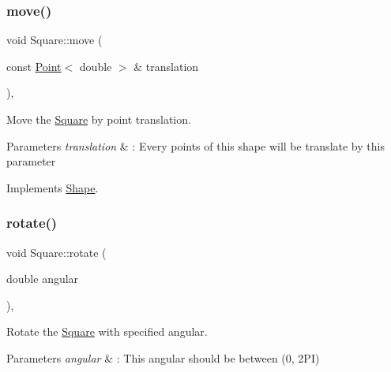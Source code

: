 \mbox{\label{classSquare_a75b2fd22fc3895b83bc20728afb20b10}} 
\subsubsection{\texorpdfstring{move()}{move()}}
{\footnotesize\ttfamily void Square\+::move (\begin{DoxyParamCaption}\item[{const \hyperlink{classPoint}{Point}$<$ double $>$ \&}]{translation }\end{DoxyParamCaption})\hspace{0.3cm}{\ttfamily [override]}, {\ttfamily [virtual]}}



Move the \hyperlink{classSquare}{Square} by point translation. 


\begin{DoxyParams}{Parameters}
{\em translation} & \+: Every points of this shape will be translate by this parameter \\
\hline
\end{DoxyParams}


Implements \hyperlink{classShape_a1f447acd6219cb10b9b7a40371519c46}{Shape}.

\mbox{\label{classSquare_a5714e182c30f996b78e74e1badd054a2}} 
\subsubsection{\texorpdfstring{rotate()}{rotate()}}
{\footnotesize\ttfamily void Square\+::rotate (\begin{DoxyParamCaption}\item[{double}]{angular }\end{DoxyParamCaption})\hspace{0.3cm}{\ttfamily [override]}, {\ttfamily [virtual]}}



Rotate the \hyperlink{classSquare}{Square} with specified angular. 


\begin{DoxyParams}{Parameters}
{\em angular} & \+: This angular should be between (0, 2\+PI) \\
\hline
\end{DoxyParams}


